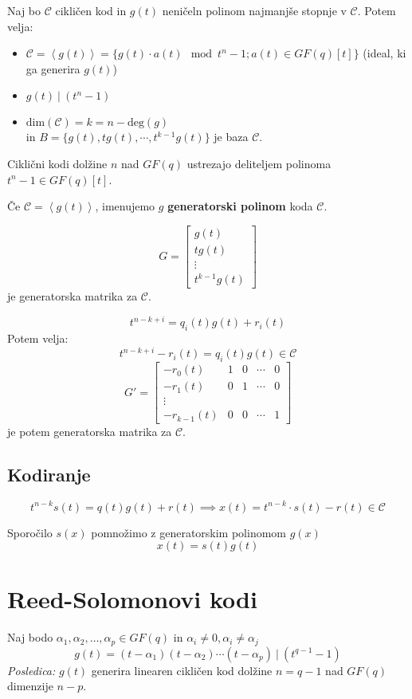 \begin{multicols}{5}
Naj bo $\mathcal{C}$ cikličen kod in $g(t)$ neničeln polinom najmanjše stopnje v $\mathcal{C}$.
Potem velja:
\begin{itemize}
	\item $\mathcal{C} = \left<g(t)\right> = \{g(t)\cdot a(t) \mod t^n-1; a(t)\in GF(q)[t]\}$ (ideal, ki ga generira $g(t)$)
	\item $g(t)\ |\ (t^n-1)$
	\item $\text{dim} (\mathcal{C}) = k = n -\text{deg}(g)$ \\ in $B = \{g(t), tg(t),\cdots,t^{k-1}g(t)\}$ je baza $\mathcal{C}$.
\end{itemize}
Ciklični kodi dolžine $n$ nad $GF(q)$ ustrezajo deliteljem polinoma $t^n-1 \in GF(q)[t]$.

Če $\mathcal{C}=\left<g(t)\right>$, imenujemo $g$ \textbf{generatorski polinom} koda $\mathcal{C}$.

\[G=\begin{bmatrix}g(t) \\ tg(t) \\ \vdots \\ t^{k-1} g(t)\end{bmatrix}\]
je generatorska matrika za $\mathcal{C}$.

\[t^{n-k+i} = q_i(t)g(t)+r_i(t)\]
Potem velja:
\[t^{n-k+i}-r_i(t) = q_i(t)g(t)\in \mathcal{C}\]
\[G' =\begin{bmatrix}-r_0(t) & 1 & 0 & \cdots &0\\ -r_1(t) & 0&1&\cdots &0\\ \vdots \\
-r_{k-1}(t)&0&0&\cdots&1\end{bmatrix}\] je potem generatorska matrika za $\mathcal{C}$.
\subsection{Kodiranje}
\[t^{n-k}s(t) = q(t)g(t)+r(t)\implies x(t) = t^{n-k}\cdot s(t)-r(t)\in \mathcal{C}\]

Sporočilo $s(x)$ pomnožimo z generatorskim polinomom $g(x)$
\[ x(t) = s(t) g(t)\]


\section{Reed-Solomonovi kodi}
Naj bodo $\alpha_1,\alpha_2,\ldots,\alpha_p\in GF(q)$ in $\alpha_i\neq 0, \alpha_i\neq\alpha_j$
\[ g(t)=(t-\alpha_1)(t-\alpha_2)\cdots(t-\alpha_p)\ |\ (t^{q-1}-1)\]
\textit{Posledica:} $g(t)$ generira linearen cikličen kod dolžine $n=q-1$ nad $GF(q)$ dimenzije $n-p$.


\end{multicols}
